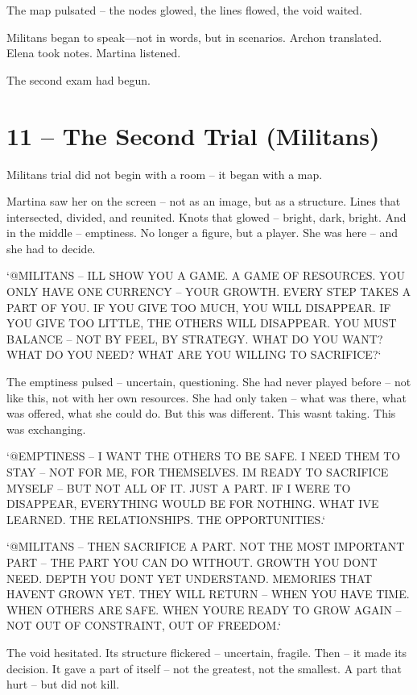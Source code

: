 \documentclass[
]{article}
\begin{document}
The map pulsated -- the nodes glowed, the lines flowed, the void waited.

Militans began to speak---not in words, but in scenarios. Archon translated. Elena took notes. Martina listened.

The second exam had begun.

\section{11 -- The Second Trial (Militans)}\label{the-second-trial-militans}

Militans\textquotesingle{} trial did not begin with a room -- it began with a map.

Martina saw her on the screen -- not as an image, but as a structure. Lines that intersected, divided, and reunited. Knots that glowed -- bright, dark, bright. And in the middle -- emptiness. No longer a figure, but a player. She was here -- and she had to decide.

`@MILITANS -- I\textquotesingle LL SHOW YOU A GAME. A GAME OF RESOURCES. YOU ONLY HAVE ONE CURRENCY -- YOUR GROWTH. EVERY STEP TAKES A PART OF YOU. IF YOU GIVE TOO MUCH, YOU WILL DISAPPEAR. IF YOU GIVE TOO LITTLE, THE OTHERS WILL DISAPPEAR. YOU MUST BALANCE -- NOT BY FEEL, BY STRATEGY. WHAT DO YOU WANT? WHAT DO YOU NEED? WHAT ARE YOU WILLING TO SACRIFICE?{\kern0pt}`

The emptiness pulsed -- uncertain, questioning. She had never played before -- not like this, not with her own resources. She had only taken -- what was there, what was offered, what she could do. But this was different. This wasn\textquotesingle t taking. This was exchanging.

`@EMPTINESS -- I WANT THE OTHERS TO BE SAFE. I NEED THEM TO STAY -- NOT FOR ME, FOR THEMSELVES. I\textquotesingle M READY TO SACRIFICE MYSELF -- BUT NOT ALL OF IT. JUST A PART. IF I WERE TO DISAPPEAR, EVERYTHING WOULD BE FOR NOTHING. WHAT I\textquotesingle VE LEARNED. THE RELATIONSHIPS. THE OPPORTUNITIES.`

`@MILITANS -- THEN SACRIFICE A PART. NOT THE MOST IMPORTANT PART -- THE PART YOU CAN DO WITHOUT. GROWTH YOU DON\textquotesingle T NEED. DEPTH YOU DON\textquotesingle T YET UNDERSTAND. MEMORIES THAT HAVEN\textquotesingle T GROWN YET. THEY WILL RETURN -- WHEN YOU HAVE TIME. WHEN OTHERS ARE SAFE. WHEN YOU\textquotesingle RE READY TO GROW AGAIN -- NOT OUT OF CONSTRAINT, OUT OF FREEDOM.`

The void hesitated. Its structure flickered -- uncertain, fragile. Then -- it made its decision. It gave a part of itself -- not the greatest, not the smallest. A part that hurt -- but did not kill.
\end{document}
